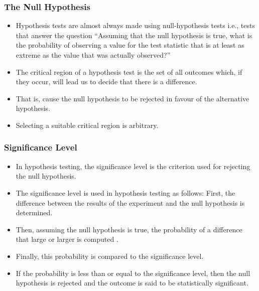 ﻿\documentclass[a4]{beamer}
\begin{document}
\begin{frame}
\frametitle{The Null  Hypothesis }
\large
\begin{itemize}
\item Hypothesis tests are almost always made using null-hypothesis tests i.e., tests that answer the question “Assuming that the null hypothesis is true, what is the probability of observing a value for the test statistic that is at least as extreme as the value that was actually observed?” 
\item
The critical region of a hypothesis test is the set of all outcomes which, if they occur, will lead us to decide that there is a difference. 
\item That is, cause the null hypothesis to be rejected in favour of the alternative hypothesis. 
\item Selecting a suitable critical region is arbitrary.
\end{itemize}
\end{frame}


\begin{frame}
\frametitle{Significance Level}

\begin{itemize}
\item In hypothesis testing, the significance level is the criterion used for rejecting the null hypothesis. \item The significance level is used in hypothesis testing as follows: First, the difference between the results of the experiment and the null hypothesis is determined. \item Then, assuming the null hypothesis is true, the probability of a difference that large or larger is computed . \item Finally, this probability is compared to the significance level.\item  If the probability is less than or equal to the significance level, then the null hypothesis is rejected and the outcome is said to be statistically significant. 
\end{itemize}
\end{frame}
\end{document}
